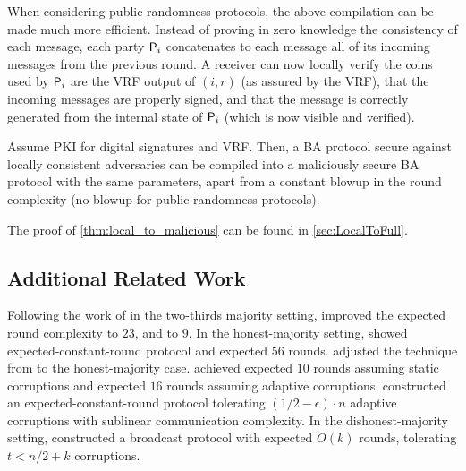 
When considering public-randomness protocols, the above compilation can be made much more efficient. Instead of proving in zero knowledge the consistency of each message, each party $\mathsf{P}_i$ concatenates to each message all of its incoming messages from the previous round. A receiver can now locally verify the coins used by $\mathsf{P}_i$ are the VRF output of $(i,r)$ (as assured by the VRF), that the incoming messages are properly signed, and that the message is correctly generated from the internal state of $\mathsf{P}_i$ (which is now visible and verified).

\begin{theorem}\label{thm:local_to_malicious}
Assume PKI for digital signatures and VRF. Then, a BA protocol secure against locally consistent adversaries can be compiled into a maliciously secure BA protocol with the same parameters, apart from a constant blowup in the round complexity (no blowup for public-randomness protocols).
\end{theorem}

The proof of \cref{thm:local_to_malicious} can be found in \cref{sec:LocalToFull}.

\subsection{Additional Related Work}\label{sec:relatedWork}

Following the work of \citet{FM97} in the two-thirds majority setting, \citet{KK06} improved the expected round complexity to $23$, and \citet{Micali17} to $9$. In the honest-majority setting, \citet{FG03} showed expected-constant-round protocol and \citet{KK06} expected $56$ rounds. \citet{MV17} adjusted the technique from \cite{Micali17} to the honest-majority case. \citet{ADDNR19} achieved expected $10$ rounds assuming static corruptions and expected $16$ rounds assuming adaptive corruptions. \citet{ACDNPRS19} constructed an expected-constant-round protocol tolerating $(1/2-\epsilon)\cdot n$ adaptive corruptions with sublinear communication complexity. In the dishonest-majority setting, \citet{GKKO07} constructed a broadcast protocol with expected $O(k)$ rounds, tolerating $t<n/2+k$ corruptions.

